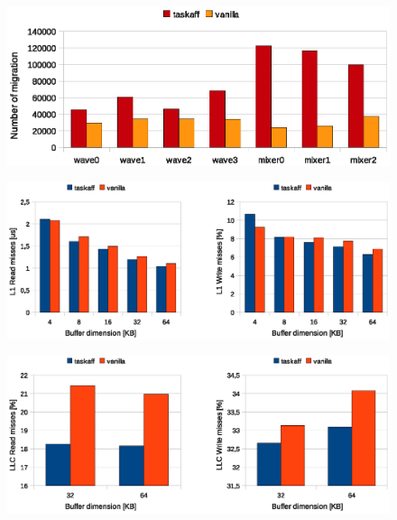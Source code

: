 \begin{figure}[htbp]
\centering
\includegraphics[width=\widefigure]{images/results_i7/migration_i7.eps}
\caption{}
\label{fig:migration_i7}
\end{figure}

\begin{figure}[htbp]
\centering
\includegraphics[width=\widefigure]{images/results_i7/l1_load_store_i7.eps}
\caption{}
\label{fig:l1_load_store_i7}
\end{figure}

\begin{figure}[htbp]
\centering
\includegraphics[width=\widefigure]{images/results_i7/l3_load_store_i7.eps}
\caption{}
\label{fig:l2_load_store_i7}
\end{figure}

